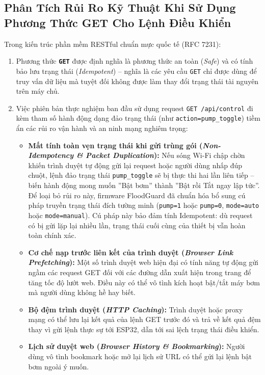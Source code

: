 \subsection{Phân Tích Rủi Ro Kỹ Thuật Khi Sử Dụng Phương Thức GET Cho Lệnh Điều Khiển}
Trong kiến trúc phần mềm RESTful chuẩn mực quốc tế (RFC 7231):
\begin{enumerate}
    \item Phương thức \textbf{\texttt{GET}} được định nghĩa là phương thức an toàn (\textit{Safe}) và có tính bảo lưu trạng thái (\textit{Idempotent}) -- nghĩa là các yêu cầu \texttt{GET} chỉ được dùng để truy vấn dữ liệu mà tuyệt đối không được làm thay đổi trạng thái tài nguyên trên máy chủ.
    \item Việc phiên bản thực nghiệm ban đầu sử dụng request \texttt{GET /api/control} đi kèm tham số hành động dạng đảo trạng thái (như \texttt{action=pump\_toggle}) tiềm ẩn các rủi ro vận hành và an ninh mạng nghiêm trọng:
    \begin{itemize}
        \item \textbf{Mất tính toàn vẹn trạng thái khi gửi trùng gói (\textit{Non-Idempotency \& Packet Duplication}):} Nếu sóng Wi-Fi chập chờn khiến trình duyệt tự động gửi lại request hoặc người dùng nhấp đúp chuột, lệnh đảo trạng thái \texttt{pump\_toggle} sẽ bị thực thi hai lần liên tiếp -- biến hành động mong muốn ''Bật bơm'' thành ''Bật rồi Tắt ngay lập tức''. Để loại bỏ rủi ro này, firmware FloodGuard đã chuẩn hóa bổ sung cú pháp truyền trạng thái đích tường minh (\texttt{pump=1} hoặc \texttt{pump=0}, \texttt{mode=auto} hoặc \texttt{mode=manual}). Cú pháp này bảo đảm tính Idempotent: dù request có bị gửi lặp lại nhiều lần, trạng thái cuối cùng của thiết bị vẫn hoàn toàn chính xác.
        \item \textbf{Cơ chế nạp trước liên kết của trình duyệt (\textit{Browser Link Prefetching}):} Một số trình duyệt web hiện đại có tính năng tự động gửi ngầm các request GET đối với các đường dẫn xuất hiện trong trang để tăng tốc độ lướt web. Điều này có thể vô tình kích hoạt bật/tắt máy bơm mà người dùng không hề hay biết.
        \item \textbf{Bộ đệm trình duyệt (\textit{HTTP Caching}):} Trình duyệt hoặc proxy mạng có thể lưu lại kết quả của lệnh GET trước đó và trả về kết quả đệm thay vì gửi lệnh thực sự tới ESP32, dẫn tới sai lệch trạng thái điều khiển.
        \item \textbf{Lịch sử duyệt web (\textit{Browser History \& Bookmarking}):} Người dùng vô tình bookmark hoặc mở lại lịch sử URL có thể gửi lại lệnh bật bơm ngoài ý muốn.
    \end{itemize}
\end{enumerate}

